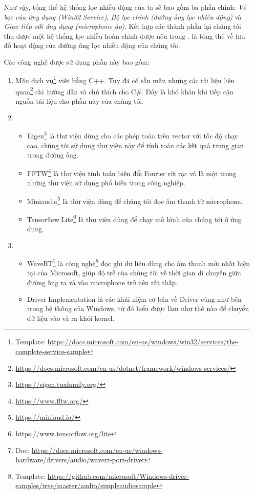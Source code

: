 		Như vậy, tổng thể hệ thống lọc nhiễu động của ta sẽ bao gồm ba phần chính: \textit{Vỏ bọc của ứng dụng (Win32 Service)}, \textit{Bộ lọc chính (đường ống lọc nhiễu động)} và \textit{Giao tiếp với ứng dụng (microphone ảo)}. Kết hợp các thành phần lại chúng tôi thu được một hệ thống lọc nhiễu hoàn chỉnh được nêu trong .  là tổng thể về lưu đồ hoạt động của đường ống lọc nhiễu động của chúng tôi.
		
		Các công nghệ được sử dụng phần này bao gồm:
		
			\begin{enumerate}[1)]
				\item {} Mẫu dịch vụ\footnote{Template: \url{https://docs.microsoft.com/en-us/windows/win32/services/the-complete-service-sample}} viết bằng C++. Tuy đã có sẵn mẫu nhưng các tài liệu liên quan\footnote{\url{https://docs.microsoft.com/en-us/dotnet/framework/windows-services/}} chỉ hướng dẫn và chú thích cho C\#. Đây là khó khăn khi tiếp cận nguồn tài liệu cho phần này của chúng tôi.
				\item {}
					\begin{itemize}
						\item Eigen\footnote{\url{https://eigen.tuxfamily.org/}} là thư viện dùng cho các phép toán trên vector với tốc độ chạy cao, chúng tôi sử dụng thư viện này để tính toán các kết quả trung gian trong đường ống.
						\item FFTW\footnote{\url{https://www.fftw.org/}} là thư viện tính toán biến đổi Fourier rời rạc và là một trong những thư viện sử dụng phổ biến trong công nghiệp.
						\item Miniaudio\footnote{\url{https://miniaud.io/}} là thư viện dùng để chúng tôi đọc âm thanh từ microphone.
						\item Tensorflow Lite\footnote{\url{https://www.tensorflow.org/lite}} là thư viện dùng để chạy mô hình của chúng tôi ở ứng dụng.
					\end{itemize}
				\item {}
					\begin{itemize}
						\item WaveRT\footnote{Doc: \url{https://docs.microsoft.com/en-us/windows-hardware/drivers/audio/wavert-port-driver}} \cite{wavert} là công nghệ\footnote{Template: \url{https://github.com/microsoft/Windows-driver-samples/tree/master/audio/simpleaudiosample}} đọc ghi dữ liệu dùng cho âm thanh mới nhất hiện tại của Microsoft, giúp độ trễ của chúng tôi về thời gian di chuyển giữa đường ống ra và vào microphone trở nên rất thấp.
						\item Driver Implementation \cite{dev_driver_wdf, win_internals} là các khái niệm cơ bản về Driver cũng như bên trong hệ thống của Windows, từ đó hiểu được làm như thế nào để chuyển dữ liệu vào và ra khỏi kernel.
					\end{itemize}
			\end{enumerate}
		
